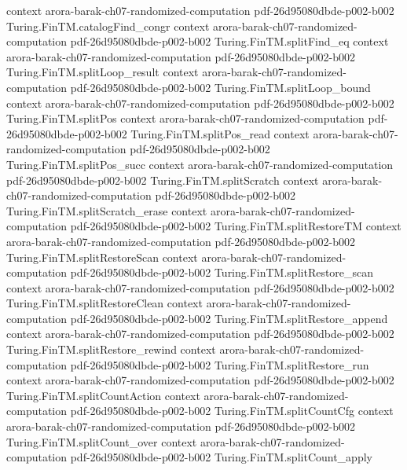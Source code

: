 \begin{theorem}
  {context}
  {arora-barak-ch07-randomized-computation}
  {pdf-26d95080dbde-p002-b002}
\proofstep
  {Turing.FinTM.catalogFind_congr}
  {context}
  {arora-barak-ch07-randomized-computation}
  {pdf-26d95080dbde-p002-b002}
\proofstep
  {Turing.FinTM.splitFind_eq}
  {context}
  {arora-barak-ch07-randomized-computation}
  {pdf-26d95080dbde-p002-b002}
\proofstep
  {Turing.FinTM.splitLoop_result}
  {context}
  {arora-barak-ch07-randomized-computation}
  {pdf-26d95080dbde-p002-b002}
\proofstep
  {Turing.FinTM.splitLoop_bound}
  {context}
  {arora-barak-ch07-randomized-computation}
  {pdf-26d95080dbde-p002-b002}
\proofstep
  {Turing.FinTM.splitPos}
  {context}
  {arora-barak-ch07-randomized-computation}
  {pdf-26d95080dbde-p002-b002}
\proofstep
  {Turing.FinTM.splitPos_read}
  {context}
  {arora-barak-ch07-randomized-computation}
  {pdf-26d95080dbde-p002-b002}
\proofstep
  {Turing.FinTM.splitPos_succ}
  {context}
  {arora-barak-ch07-randomized-computation}
  {pdf-26d95080dbde-p002-b002}
\proofstep
  {Turing.FinTM.splitScratch}
  {context}
  {arora-barak-ch07-randomized-computation}
  {pdf-26d95080dbde-p002-b002}
\proofstep
  {Turing.FinTM.splitScratch_erase}
  {context}
  {arora-barak-ch07-randomized-computation}
  {pdf-26d95080dbde-p002-b002}
\proofstep
  {Turing.FinTM.splitRestoreTM}
  {context}
  {arora-barak-ch07-randomized-computation}
  {pdf-26d95080dbde-p002-b002}
\proofstep
  {Turing.FinTM.splitRestoreScan}
  {context}
  {arora-barak-ch07-randomized-computation}
  {pdf-26d95080dbde-p002-b002}
\proofstep
  {Turing.FinTM.splitRestore_scan}
  {context}
  {arora-barak-ch07-randomized-computation}
  {pdf-26d95080dbde-p002-b002}
\proofstep
  {Turing.FinTM.splitRestoreClean}
  {context}
  {arora-barak-ch07-randomized-computation}
  {pdf-26d95080dbde-p002-b002}
\proofstep
  {Turing.FinTM.splitRestore_append}
  {context}
  {arora-barak-ch07-randomized-computation}
  {pdf-26d95080dbde-p002-b002}
\proofstep
  {Turing.FinTM.splitRestore_rewind}
  {context}
  {arora-barak-ch07-randomized-computation}
  {pdf-26d95080dbde-p002-b002}
\proofstep
  {Turing.FinTM.splitRestore_run}
  {context}
  {arora-barak-ch07-randomized-computation}
  {pdf-26d95080dbde-p002-b002}
\proofstep
  {Turing.FinTM.splitCountAction}
  {context}
  {arora-barak-ch07-randomized-computation}
  {pdf-26d95080dbde-p002-b002}
\proofstep
  {Turing.FinTM.splitCountCfg}
  {context}
  {arora-barak-ch07-randomized-computation}
  {pdf-26d95080dbde-p002-b002}
\proofstep
  {Turing.FinTM.splitCount_over}
  {context}
  {arora-barak-ch07-randomized-computation}
  {pdf-26d95080dbde-p002-b002}
\proofstep
  {Turing.FinTM.splitCount_apply}

\end{theorem}
